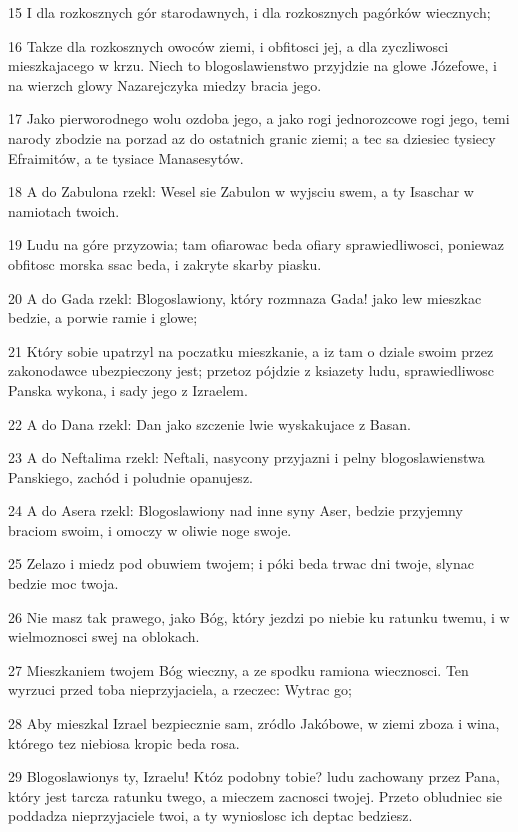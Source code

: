 \par 15 I dla rozkosznych gór starodawnych, i dla rozkosznych pagórków wiecznych;
\par 16 Takze dla rozkosznych owoców ziemi, i obfitosci jej, a dla zyczliwosci mieszkajacego w krzu. Niech to blogoslawienstwo przyjdzie na glowe Józefowe, i na wierzch glowy Nazarejczyka miedzy bracia jego.
\par 17 Jako pierworodnego wolu ozdoba jego, a jako rogi jednorozcowe rogi jego, temi narody zbodzie na porzad az do ostatnich granic ziemi; a tec sa dziesiec tysiecy Efraimitów, a te tysiace Manasesytów.
\par 18 A do Zabulona rzekl: Wesel sie Zabulon w wyjsciu swem, a ty Isaschar w namiotach twoich.
\par 19 Ludu na góre przyzowia; tam ofiarowac beda ofiary sprawiedliwosci, poniewaz obfitosc morska ssac beda, i zakryte skarby piasku.
\par 20 A do Gada rzekl: Blogoslawiony, który rozmnaza Gada! jako lew mieszkac bedzie, a porwie ramie i glowe;
\par 21 Który sobie upatrzyl na poczatku mieszkanie, a iz tam o dziale swoim przez zakonodawce ubezpieczony jest; przetoz pójdzie z ksiazety ludu, sprawiedliwosc Panska wykona, i sady jego z Izraelem.
\par 22 A do Dana rzekl: Dan jako szczenie lwie wyskakujace z Basan.
\par 23 A do Neftalima rzekl: Neftali, nasycony przyjazni i pelny blogoslawienstwa Panskiego, zachód i poludnie opanujesz.
\par 24 A do Asera rzekl: Blogoslawiony nad inne syny Aser, bedzie przyjemny braciom swoim, i omoczy w oliwie noge swoje.
\par 25 Zelazo i miedz pod obuwiem twojem; i póki beda trwac dni twoje, slynac bedzie moc twoja.
\par 26 Nie masz tak prawego, jako Bóg, który jezdzi po niebie ku ratunku twemu, i w wielmoznosci swej na oblokach.
\par 27 Mieszkaniem twojem Bóg wieczny, a ze spodku ramiona wiecznosci. Ten wyrzuci przed toba nieprzyjaciela, a rzeczec: Wytrac go;
\par 28 Aby mieszkal Izrael bezpiecznie sam, zródlo Jakóbowe, w ziemi zboza i wina, którego tez niebiosa kropic beda rosa.
\par 29 Blogoslawionys ty, Izraelu! Któz podobny tobie? ludu zachowany przez Pana, który jest tarcza ratunku twego, a mieczem zacnosci twojej. Przeto obludniec sie poddadza nieprzyjaciele twoi, a ty wynioslosc ich deptac bedziesz.

